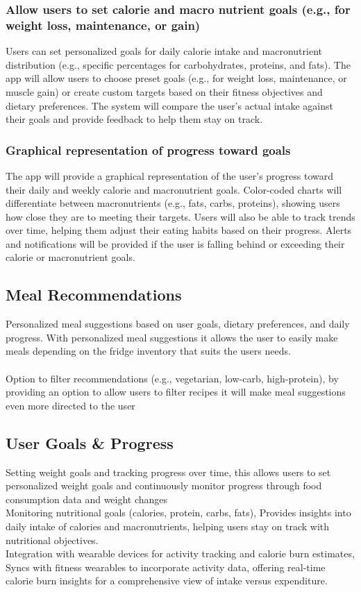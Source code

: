 \documentclass[conference]{IEEEtran}
\begin{document}
\subsubsection{Allow users to set calorie and macro nutrient goals (e.g.,
for weight loss, maintenance, or gain)}
Users can set personalized goals for daily calorie intake and macronutrient distribution (e.g., specific percentages for carbohydrates, proteins, and fats). The app will allow users to choose preset goals (e.g., for weight loss, maintenance, or muscle gain) or create custom targets based on their fitness objectives and dietary preferences. The system will compare the user’s actual intake against their goals and provide feedback to help them stay on track.\\

\subsubsection{Graphical representation of progress toward goals}
The app will provide a graphical representation of the user’s progress toward their daily and weekly calorie and macronutrient goals. Color-coded charts will differentiate between macronutrients (e.g., fats, carbs, proteins), showing users how close they are to meeting their targets. Users will also be able to track trends over time, helping them adjust their eating habits based on their progress. Alerts and notifications will be provided if the user is falling behind or exceeding their calorie or macronutrient goals.


\subsection{Meal Recommendations}
Personalized meal suggestions based on user goals, dietary preferences, and daily progress. With personalized meal suggestions it allows the user to easily make meals depending on the fridge inventory that suits the users needs.\\\\
Option to filter recommendations (e.g., vegetarian, low-carb, high-protein), by providing an option to allow users to filter recipes it will make meal suggestions even more directed to the user

\subsection{User Goals \& Progress}
Setting weight goals and tracking progress over time, this allows users to set personalized weight goals and continuously monitor progress through food consumption data and weight changes\\
Monitoring nutritional goals (calories, protein, carbs, fats), Provides insights into daily intake of calories and macronutrients, helping users stay on track with nutritional objectives.\\
Integration with wearable devices for activity tracking and calorie burn estimates, Syncs with fitness wearables to incorporate activity data, offering real-time calorie burn insights for a comprehensive view of intake versus expenditure.
\end{document}
